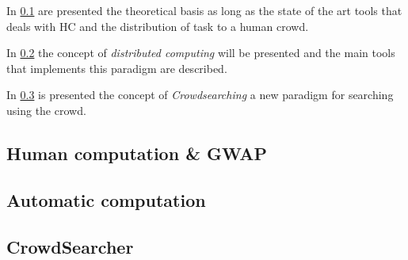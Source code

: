 In \ref{sec:bg:crowd:human} are presented the theoretical basis as long as
the state of the art tools that deals with \ac{HC} and the distribution of task
to a human crowd.

In \ref{sec:bg:crowd:auto} the concept of \emph{distributed computing} will
be presented and the main tools that implements this paradigm are described.

In \ref{sec:bg:crowd:cs} is presented the concept of \emph{Crowdsearching}
a new paradigm for searching using the crowd.


\subsection{Human computation \& \acs{GWAP}}
\label{sec:bg:crowd:human}


\subsection{Automatic computation}
\label{sec:bg:crowd:auto}


\subsection{CrowdSearcher}
\label{sec:bg:crowd:cs}
